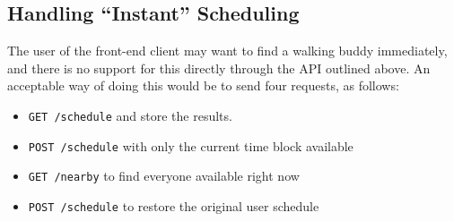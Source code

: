 \documentclass[fleqn,12pt]{article}
\begin{document}
\subsection*{Handling ``Instant'' Scheduling}
The user of the front-end client may want to find a walking buddy immediately,
and there is no support for this directly through the API outlined above. An
acceptable way of doing this would be to send four requests, as follows:
\begin{itemize}
\item \texttt{GET /schedule} and store the results.
\item \texttt{POST /schedule} with only the current time block available
\item \texttt{GET /nearby} to find everyone available right now
\item \texttt{POST /schedule} to restore the original user schedule
\end{itemize}
\end{document}
